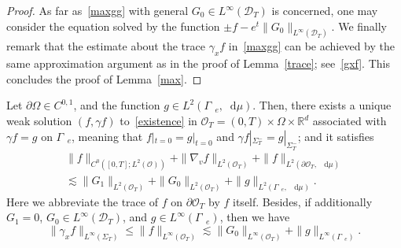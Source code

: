 \documentclass[AHL,Unicode,longabstracts,published]{cedram}
\newcommand*{\dif}{\mathop{}\!\mathrm{d}}
\newcommand*\p{\partial}
\newcommand*\R {\mathbb{R}}
\newcommand*\Ge {\Gamma_{\;\!\!\;\!\!e}}
\newcommand*\D {\mathcal{D}}
\newcommand*\OO {\mathcal{O}}
\begin{document}
\begin{proof}
As far as~\eqref{maxgg} with general $G_0\in L^\infty(\D_T)$ is concerned, one may consider the equation solved by the function $\pm f-e^{t}\|G_0\|_{L^\infty(\D_T)}$. We finally remark that the estimate about the trace $\gamma_xf$ in~\eqref{maxgg} can be achieved by the same approximation argument as in the proof of Lemma~\ref{trace}; see~\eqref{gxf}. This concludes the proof of Lemma~\ref{max}.
\end{proof}

\begin{coro}\label{globalin}
Let $\p\Omega\in C^{0,1}$, and the function $g\in L^2(\Ge,\dif\mu)$. Then, there exists a unique weak solution $(f,\gamma f)$ to~\eqref{existence} in $\OO_T=(0,T)\times\Omega\times\R^d$ associated with $\gamma f=g$ on $\Ge$, meaning that $f|_{t=0}=g|_{t=0}$ and $\gamma f|_{\Sigma_T^-}=g|_{\Sigma_T^-}$; and it satisfies
\begin{multline}\label{FPenergy}
\|f\|_{C^0\left([0,T];L^2(\OO)\right)} +\|\nabla_vf\|_{L^2(\OO_T)} +\|f\|_{L^2\left(\p\OO_T,\;\!\dif\mu\right)}\\
\lesssim \|G_1\|_{L^2(\OO_T)} + \|G_0\|_{L^2(\OO_T)} +\|g\|_{L^2\left(\Ge,\;\!\dif\mu\right)}.
\end{multline}
Here we abbreviate the trace of $f$ on $\p\OO_T$ by $f$ itself. Besides, if additionally $G_1=0$, $G_0\in L^\infty(\D_T)$, and $g\in L^\infty(\Ge)$, then we have
\begin{equation}\label{maxglobal}
\|\gamma_xf\|_{L^\infty(\Sigma_T)}
\le\|f\|_{L^\infty(\OO_T)}
\lesssim \|G_0\|_{L^\infty(\OO_T)} +\|g\|_{L^\infty(\Ge)}.
\end{equation}
\end{coro}
\end{document}
